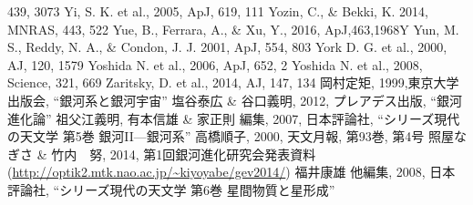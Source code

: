 \begin{thebibliography}{99}
\begin{multicols}{2}
{   	439, 3073
	Yi, S. K. et al., 2005, ApJ, 619, 111
   	Yozin, C., \& Bekki, K. 2014, MNRAS, 443, 522
    	Yue, B., Ferrara, A., \& Xu, Y., 2016, ApJ,463,1968Y
    	Yun, M. S., Reddy, N. A., \& Condon, J. J. 2001, ApJ, 554, 803
	York D. G. et al., 2000, AJ, 120, 1579
    	Yoshida N. et al., 2006, ApJ, 652, 2
   	Yoshida N. et al., 2008, Science, 321, 669
	Zaritsky, D. et al., 2014, AJ, 147, 134
	岡村定矩, 1999,東京大学出版会, ``銀河系と銀河宇宙''
	塩谷泰広 \& 谷口義明, 2012, プレアデス出版, ``銀河進化論''
	祖父江義明, 有本信雄 \& 家正則 編集, 2007, 日本評論社, ``シリーズ現代の天文学 第5巻 銀河II—銀河系''
	高橋順子, 2000, 天文月報, 第93巻, 第4号
	照屋なぎさ \& 竹内　努, 2014, 第1回銀河進化研究会発表資料(\url{http://optik2.mtk.nao.ac.jp/~kiyoyabe/gev2014/})
	福井康雄 他編集, 2008, 日本評論社, ``シリーズ現代の天文学 第6巻 星間物質と星形成''
}
\end{multicols}
\end{thebibliography}

%
